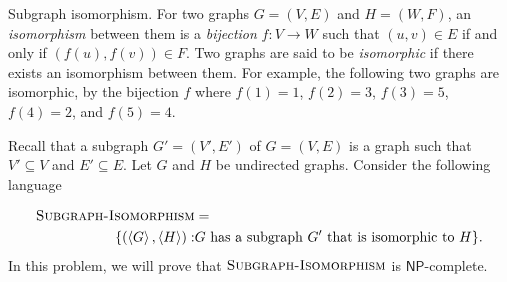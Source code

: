 \documentclass[12pt, letterpaper]{article}
\newcommand{\NP}{\mathsf{NP}}
\newcommand{\ang}[1]{\left\langle #1 \right\rangle}
\begin{document}
\begin{problem}{Subgraph isomorphism.}
    For two graphs $G = (V,E)$ and $H = (W, F)$, an \emph{isomorphism} between them is a \emph{bijection} $f:V \to W$ such that $(u,v) \in E$ if and only if $(f(u), f(v)) \in F$. Two graphs are said to be \emph{isomorphic} if there exists an isomorphism between them. For example, the following two graphs are isomorphic, by the bijection $f$ where $f(1) = 1$, $f(2) = 3$, $f(3) = 5$, $f(4) = 2$, and $f(5) = 4$. 

\begin{figure}[H]
    \centering
    \begin{minipage}{0.45\textwidth}
        \centering
    \end{minipage}
    \begin{minipage}{0.45\textwidth}
        \centering
    \end{minipage}
\end{figure}

     Recall that a subgraph $G' = (V', E')$ of $G = (V, E)$ is a graph such that $V' \subseteq V$ and $E' \subseteq E$. Let $G$ and $H$ be undirected graphs. Consider the following language
      
      \begin{align*}
        \subgraphiso &= \\ \set{(\ang{G}, \ang{H}): &\text{$G$ has a subgraph $G'$ that is isomorphic to $H$}}.
      \end{align*}
      In this problem, we will prove that $\textsc{Subgraph-Isomorphism}$ is $\NP$-complete.
\end{problem}
\end{document}
